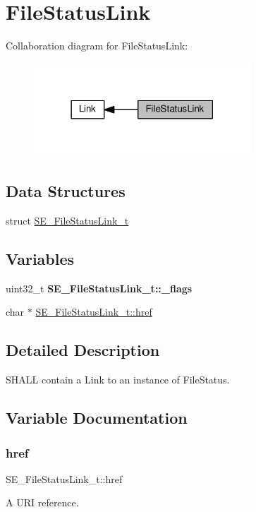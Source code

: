 \hypertarget{group__FileStatusLink}{}\section{File\+Status\+Link}
\label{group__FileStatusLink}
Collaboration diagram for File\+Status\+Link\+:\nopagebreak
\begin{figure}[H]
\begin{center}
\leavevmode
\includegraphics[width=230pt]{group__FileStatusLink}
\end{center}
\end{figure}
\subsection*{Data Structures}
\begin{DoxyCompactItemize}
\item 
struct \hyperlink{structSE__FileStatusLink__t}{S\+E\+\_\+\+File\+Status\+Link\+\_\+t}
\end{DoxyCompactItemize}
\subsection*{Variables}
\begin{DoxyCompactItemize}
\item 
\mbox{\label{group__FileStatusLink_ga831ead5d05bfcdf15dd47bf3a8c25af9}} 
uint32\+\_\+t {\bfseries S\+E\+\_\+\+File\+Status\+Link\+\_\+t\+::\+\_\+flags}
\item 
char $\ast$ \hyperlink{group__FileStatusLink_ga5cbd31e8cea3d76aa24c5e3197680143}{S\+E\+\_\+\+File\+Status\+Link\+\_\+t\+::href}
\end{DoxyCompactItemize}


\subsection{Detailed Description}
S\+H\+A\+LL contain a Link to an instance of File\+Status. 

\subsection{Variable Documentation}
\mbox{\label{group__FileStatusLink_ga5cbd31e8cea3d76aa24c5e3197680143}} 
\subsubsection{\texorpdfstring{href}{href}}
{\footnotesize\ttfamily S\+E\+\_\+\+File\+Status\+Link\+\_\+t\+::href}

A U\+RI reference. 